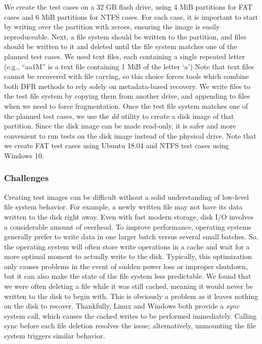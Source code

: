 We create the test cases on a 32 GB flash drive, using 4 MiB partitions for FAT cases and 6 MiB partitions for NTFS cases.
For each case, it is important to start by writing over the partition with zeroes, ensuring the image is easily reproduceable.
Next, a file system should be written to the partition, and files should be written to it and deleted until the file system matches one of the planned test cases.
We used text files, each containing a single repeated letter (e.g., ``aa1M'' is a text file containing 1 MiB of the letter `a')
Note that text files cannot be recovered with file carving, so this choice forces tools which combine both DFR methods to rely solely on metadata-based recovery.
We write files to the test file system by copying them from another drive, and appending to files when we need to force fragmentation.
Once the test file system matches one of the planned test cases, we use the \emph{dd} utility to create a disk image of that partition.
Since the disk image can be made read-only, it is safer and more convenient to run tests on the disk image instead of the physical drive.
Note that we create FAT test cases using Ubuntu 18.04 and NTFS test cases using Windows 10.

\subsubsection{Challenges}

Creating test images can be difficult without a solid understanding of low-level file system behavior.
For example, a newly written file may not have its data written to the disk right away.
Even with fast modern storage, disk I/O involves a considerable amount of overhead.
To improve performance, operating systems generally prefer to write data in one larger batch versus several small batches.
So, the operating system will often store write operations in a cache and wait for a more optimal moment to actually write to the disk.
Typically, this optimization only causes problems in the event of sudden power loss or improper shutdown, but it can also make the state of the file system less predictable.
We found that we were often deleting a file while it was still cached, meaning it would never be written to the disk to begin with.
This is obviously a problem as it leaves nothing on the disk to recover.
Thankfully, Linux and Windows both provide a \emph{sync} system call, which causes the cached writes to be performed immediately.
Calling sync before each file deletion resolves the issue; alternatively, unmounting the file system triggers similar behavior.

